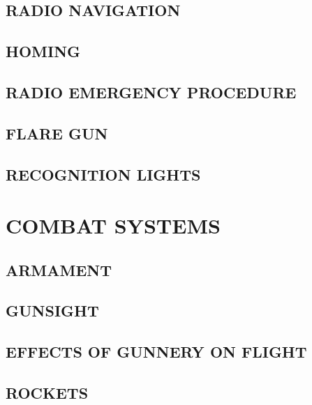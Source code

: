 \subsection{RADIO NAVIGATION}
\subsection{HOMING}
\subsection{RADIO EMERGENCY PROCEDURE}
\subsection{FLARE GUN}
\subsection{RECOGNITION LIGHTS}


\section{COMBAT SYSTEMS}
\subsection{ARMAMENT}
\subsection{GUNSIGHT}
\subsection{EFFECTS OF GUNNERY ON FLIGHT}
\subsection{ROCKETS}
